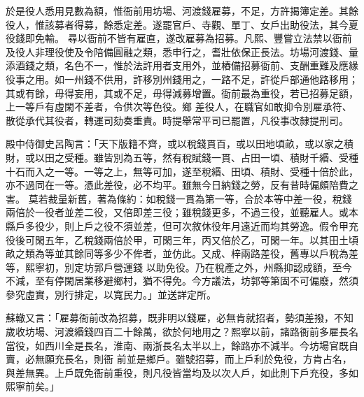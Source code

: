 \begin{pinyinscope}
 於是役人悉用見數為額，惟衙前用坊場、河渡錢雇募，不足，方許揭簿定差。其餘役人，惟該募者得募，餘悉定差。遂罷官戶、寺觀、單丁、女戶出助役法，其今夏役錢即免輸。
 尋以衙前不皆有雇直，遂改雇募為招募。凡熙、豐嘗立法禁以衙前及役人非理役使及令陪備圓融之類，悉申行之，耆壯依保正長法。坊場河渡錢、量添酒錢之類，名色不一，惟於法許用者支用外，並樁備招募衙前、支酬重難及應緣役事之用。如一州錢不供用，許移別州錢用之，一路不足，許從戶部通他路移用；其或有餘，毋得妄用，其或不足，毋得減募增置。衙前最為重役，若已招募足額，上一等戶有虛閑不差者，令供次等色役。鄉
 差役人，在職官如敢抑令別雇承符、散從承代其役者，轉運司劾奏重責。時提舉常平司已罷置，凡役事改隸提刑司。



 殿中侍御史呂陶言：「天下版籍不齊，或以稅錢貫百，或以田地頃畝，或以家之積財，或以田之受種。雖皆別為五等，然有稅賦錢一貫、占田一頃、積財千緡、受種十石而入之一等。一等之上，無等可加，遂至稅緡、田頃、積財、受種十倍於此，亦不過同在一等。憑此差役，必不均平。雖無今日納錢之勞，反有昔時偏頗陪費之害。
 莫若裁量新舊，著為條約：如稅錢一貫為第一等，合於本等中差一役，稅錢兩倍於一役者並差二役，又倍即差三役；雖稅錢更多，不過三役，並聽雇人。或本縣戶多役少，則上戶之役不須並差，但可次敘休役年月遠近而均其勞逸。假令甲充役後可閑五年，乙稅錢兩倍於甲，可閑三年，丙又倍於乙，可閑一年。以其田土頃畝之類為等並其餘同等多少不侔者，並仿此。又成、梓兩路差役，舊專以戶稅為差等，熙寧初，別定坊郭戶營運錢
 以助免役。乃在稅產之外，州縣抑認成額，至今不減，至有停閑居業移避鄉村，猶不得免。今方議法，坊郭等第固不可偏廢，然須參究虛實，別行排定，以寬民力。」並送詳定所。



 蘇轍又言：「雇募衙前改為招募，既非明以錢雇，必無肯就招者，勢須差撥，不知歲收坊場、河渡緡錢四百二十餘萬，欲於何地用之？熙寧以前，諸路衙前多雇長名當役，如西川全是長名，淮南、兩浙長名太半以上，餘路亦不減半。今坊場官既自賣，必無願充長名，則衙
 前並是鄉戶。雖號招募，而上戶利於免役，方肯占名，與差無異。上戶既免衙前重役，則凡役皆當均及以次人戶，如此則下戶充役，多如熙寧前矣。」



\end{pinyinscope}